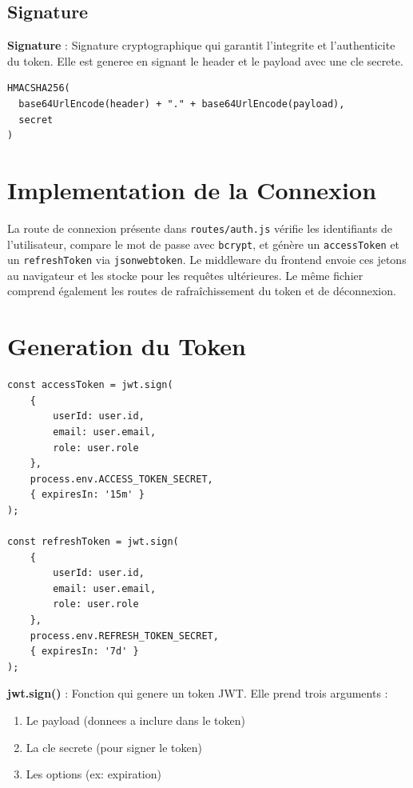 \documentclass[a4paper,12pt]{book}
\begin{document}
\subsection{Signature}

\begin{definitionbox}
    \textbf{Signature} : Signature cryptographique qui garantit l'integrite et l'authenticite du token. Elle est generee en signant le header et le payload avec une cle secrete.
\end{definitionbox}

\begin{lstlisting}[style=javascript]
HMACSHA256(
  base64UrlEncode(header) + "." + base64UrlEncode(payload),
  secret
)
\end{lstlisting}

\section{Implementation de la Connexion}

La route de connexion présente dans \texttt{routes/auth.js} vérifie les identifiants de l'utilisateur, compare le mot de passe avec \texttt{bcrypt}, et génère un \texttt{accessToken} et un \texttt{refreshToken} via \texttt{jsonwebtoken}. Le middleware du frontend envoie ces jetons au navigateur et les stocke pour les requêtes ultérieures. Le même fichier comprend également les routes de rafraîchissement du token et de déconnexion.

\section{Generation du Token}

\begin{lstlisting}[style=javascript]
const accessToken = jwt.sign(
    {
        userId: user.id,
        email: user.email,
        role: user.role
    },
    process.env.ACCESS_TOKEN_SECRET,
    { expiresIn: '15m' }
);

const refreshToken = jwt.sign(
    {
        userId: user.id,
        email: user.email,
        role: user.role
    },
    process.env.REFRESH_TOKEN_SECRET,
    { expiresIn: '7d' }
);
\end{lstlisting}

\begin{definitionbox}
    \textbf{jwt.sign()} : Fonction qui genere un token JWT. Elle prend trois arguments :
    \begin{enumerate}
        \item Le payload (donnees a inclure dans le token)
        \item La cle secrete (pour signer le token)
        \item Les options (ex: expiration)
    \end{enumerate}
\end{definitionbox}
\end{document}
